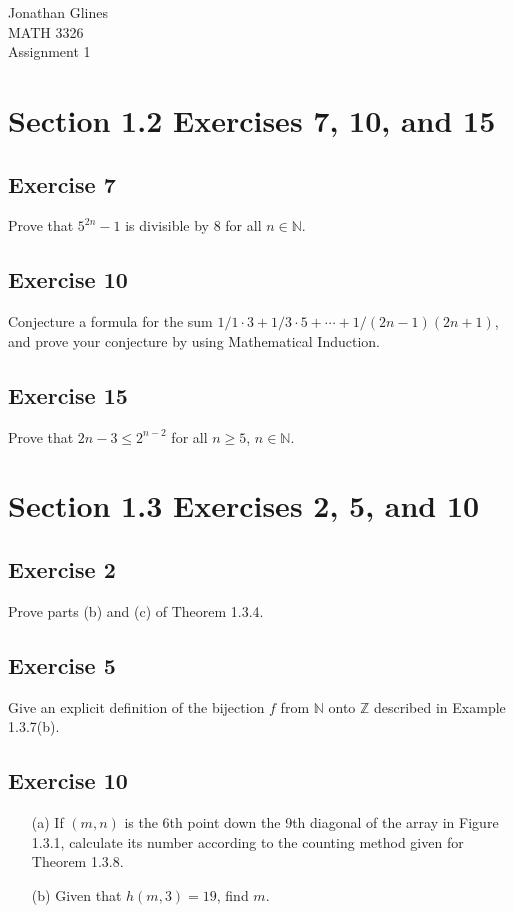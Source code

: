 \documentclass[12pt]{article}
\begin{document}
\begin{flushright}
{\Large
Jonathan Glines \\
MATH 3326 \\
Assignment 1 \\
}
\end{flushright}
\section*{Section 1.2 Exercises 7, 10, and 15}
\subsection*{Exercise 7}
Prove that $5^{2n} - 1$ is divisible by 8 for all $n \in \mathbb{N}$.
\subsection*{Exercise 10}
Conjecture a formula for the sum $1/1\cdot 3 + 1/3 \cdot 5 + \cdots + 1 / \left(2n - 1\right)\left(2n+1\right)$, and prove your conjecture by using Mathematical Induction.
\subsection*{Exercise 15}
Prove that $2n - 3 \leq 2^{n-2}$ for all $n \geq 5$, $n \in \mathbb{N}$.
\section*{Section 1.3 Exercises 2, 5, and 10}
\subsection*{Exercise 2}
Prove parts (b) and (c) of Theorem 1.3.4.
\subsection*{Exercise 5}
Give an explicit definition of the bijection $f$ from $\mathbb{N}$ onto $\mathbb{Z}$ described in Example 1.3.7(b).
\subsection*{Exercise 10}
\begin{itemize}
\item[(a)] If $\left(m, n\right)$ is the 6th point down the 9th diagonal of the array in Figure 1.3.1, calculate its number according to the counting method given for Theorem 1.3.8.
\item[(b)] Given that $h\left(m, 3\right) = 19$, find $m$.
\end{itemize}
\end{document}
